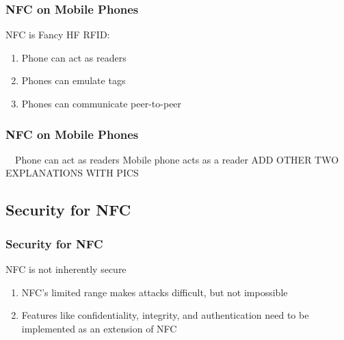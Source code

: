 \documentclass[unknownkeysallowed]{beamer}
\begin{document}
\begin{frame}
\frametitle{NFC on Mobile Phones}
  \begin{center}
  \begin{minipage}{.7\textwidth}
  \begin{block}{NFC is Fancy HF RFID:}
		\begin{enumerate}
		  \item{Phone can act as readers}
		  \item{Phones can emulate tags}
      \item{Phones can communicate peer-to-peer}
   	\end{enumerate}
  \end{block}
  \end{minipage}
  \end{center}
\end{frame}

\begin{frame}
\frametitle{NFC on Mobile Phones}
  \begin{center}
  \begin{minipage}{.7\textwidth}
  \begin{block}{~~Phone can act as readers}
    Mobile phone acts as a reader
    ADD OTHER TWO EXPLANATIONS WITH PICS
  \end{block}
  \end{minipage}
  \end{center}
\end{frame}


\subsection{Security for NFC}
\begin{frame}
\frametitle{Security for NFC}
  \begin{center}
  \begin{minipage}{.7\textwidth}
  \begin{block}{NFC is not inherently secure}
    \begin{enumerate}
      \item{NFC's limited range makes attacks difficult, but not impossible}
      \item{Features like confidentiality, integrity, and authentication need to be implemented as an extension of NFC}
    \end{enumerate}
  \end{block}
  \end{minipage}
  \end{center}
\end{frame}
\end{document}
